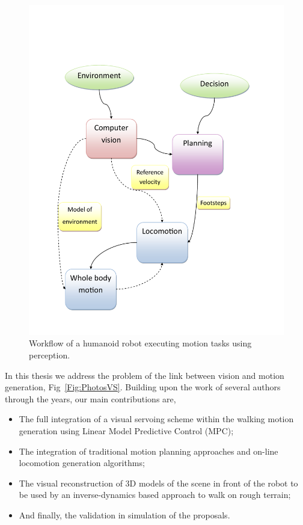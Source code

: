 \begin{figure}[h!]
\centering
\includegraphics[scale=0.5]{Chap1-Introduction/general-diagram.pdf}
\caption[]{ \label{Fig:GeneralDiagram} Workflow of a humanoid robot executing motion tasks using perception.}
\end{figure}

In this thesis we address the problem of the link between vision and motion generation, Fig~\ref{Fig:PhotosVS}. Building upon the work of several authors through the years, our main contributions are,

\begin{itemize}
\item The full integration of a visual servoing scheme within the walking motion generation using Linear Model Predictive Control (MPC);
\item The integration of traditional motion planning approaches and on-line locomotion generation algorithms;
\item The visual reconstruction of 3D models of the scene in front of the robot to be used by an inverse-dynamics based approach to walk on rough terrain;
\item And finally, the validation in simulation of the proposals.
\end{itemize}

